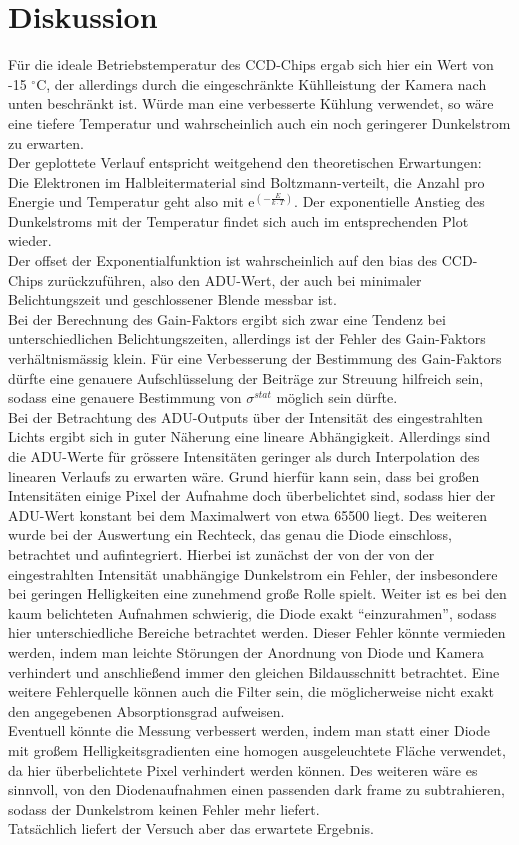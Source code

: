 \section{Diskussion}
Für die ideale Betriebstemperatur des CCD-Chips ergab sich hier ein Wert von -15 $^\circ$C, der allerdings durch die eingeschränkte Kühlleistung der Kamera nach unten beschränkt ist. Würde man eine verbesserte Kühlung verwendet, so wäre eine tiefere Temperatur und wahrscheinlich auch ein noch geringerer Dunkelstrom zu erwarten. \\
Der geplottete Verlauf entspricht weitgehend den theoretischen Erwartungen: \\
Die Elektronen im Halbleitermaterial sind Boltzmann-verteilt, die Anzahl pro Energie und Temperatur geht also mit $\mathrm{e}^{(-\frac{E}{k \cdot T})}$. Der exponentielle Anstieg des Dunkelstroms mit der Temperatur findet sich auch im entsprechenden Plot wieder. \\
Der offset der Exponentialfunktion ist wahrscheinlich auf den bias des CCD-Chips zurückzuführen, also den ADU-Wert, der auch bei minimaler Belichtungszeit und geschlossener Blende messbar ist. \\
Bei der Berechnung des Gain-Faktors ergibt sich zwar eine Tendenz bei unterschiedlichen Belichtungszeiten, allerdings ist der Fehler des Gain-Faktors verhältnismässig klein. Für eine Verbesserung der Bestimmung des Gain-Faktors dürfte eine genauere Aufschlüsselung der Beiträge zur Streuung hilfreich sein, sodass eine genauere Bestimmung von $\sigma^{stat}$ möglich sein dürfte. \\
Bei der Betrachtung des ADU-Outputs über der Intensität des eingestrahlten Lichts ergibt sich in guter Näherung eine lineare Abhängigkeit. Allerdings sind die ADU-Werte für grössere Intensitäten geringer als durch Interpolation des linearen Verlaufs zu erwarten wäre. Grund hierfür kann sein, dass bei großen Intensitäten einige Pixel der Aufnahme doch überbelichtet sind, sodass hier der ADU-Wert konstant bei dem Maximalwert von etwa 65500 liegt. Des weiteren wurde bei der Auswertung ein Rechteck, das genau die Diode einschloss, betrachtet und aufintegriert. Hierbei ist zunächst der von der von der eingestrahlten Intensität unabhängige Dunkelstrom ein Fehler, der insbesondere bei geringen Helligkeiten eine zunehmend große Rolle spielt. Weiter ist es bei den kaum belichteten Aufnahmen schwierig, die Diode exakt \enquote{einzurahmen}, sodass hier unterschiedliche Bereiche betrachtet werden. Dieser Fehler könnte vermieden werden, indem man leichte Störungen der Anordnung von Diode und Kamera verhindert und anschließend immer den gleichen Bildausschnitt betrachtet. Eine weitere Fehlerquelle können auch die Filter sein, die möglicherweise nicht exakt den angegebenen Absorptionsgrad aufweisen. \\
Eventuell könnte die Messung verbessert werden, indem man statt einer Diode mit großem Helligkeitsgradienten eine homogen ausgeleuchtete Fläche verwendet, da hier überbelichtete Pixel verhindert werden können. Des weiteren wäre es sinnvoll, von den Diodenaufnahmen einen passenden dark frame zu subtrahieren, sodass der Dunkelstrom keinen Fehler mehr liefert. \\
Tatsächlich liefert der Versuch aber das erwartete Ergebnis. 